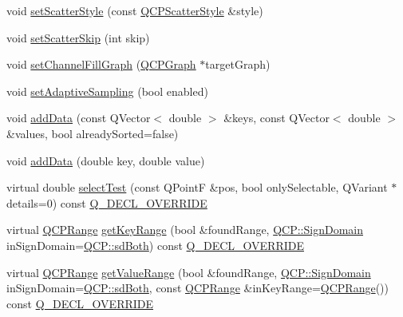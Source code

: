 \begin{DoxyCompactItemize}
\item 
void \hyperlink{class_q_c_p_graph_a12bd17a8ba21983163ec5d8f42a9fea5}{set\+Scatter\+Style} (const \hyperlink{class_q_c_p_scatter_style}{Q\+C\+P\+Scatter\+Style} \&style)
\item 
void \hyperlink{class_q_c_p_graph_a17cebd3196f434258abb82ba6dc443f2}{set\+Scatter\+Skip} (int skip)
\item 
void \hyperlink{class_q_c_p_graph_a2d03156df1b64037a2e36cfa50351ca3}{set\+Channel\+Fill\+Graph} (\hyperlink{class_q_c_p_graph}{Q\+C\+P\+Graph} $\ast$target\+Graph)
\item 
void \hyperlink{class_q_c_p_graph_ab468cd600160f327836aa0644291e64c}{set\+Adaptive\+Sampling} (bool enabled)
\item 
void \hyperlink{class_q_c_p_graph_ae0555c0d3fe0fa7cb8628f88158d420f}{add\+Data} (const Q\+Vector$<$ double $>$ \&keys, const Q\+Vector$<$ double $>$ \&values, bool already\+Sorted=false)
\item 
void \hyperlink{class_q_c_p_graph_a0bf98b1972286cfb7b1c4b7dd6ae2012}{add\+Data} (double key, double value)
\item 
virtual double \hyperlink{class_q_c_p_graph_a6d669d04462d272c6aa0e5f85846d673}{select\+Test} (const Q\+PointF \&pos, bool only\+Selectable, Q\+Variant $\ast$details=0) const \hyperlink{qcustomplot_8hh_a42cc5eaeb25b85f8b52d2a4b94c56f55}{Q\+\_\+\+D\+E\+C\+L\+\_\+\+O\+V\+E\+R\+R\+I\+DE}
\item 
virtual \hyperlink{class_q_c_p_range}{Q\+C\+P\+Range} \hyperlink{class_q_c_p_graph_aac47c6189e3aea46ea46939e5d14796c}{get\+Key\+Range} (bool \&found\+Range, \hyperlink{namespace_q_c_p_afd50e7cf431af385614987d8553ff8a9}{Q\+C\+P\+::\+Sign\+Domain} in\+Sign\+Domain=\hyperlink{namespace_q_c_p_afd50e7cf431af385614987d8553ff8a9aa38352ef02d51ddfa4399d9551566e24}{Q\+C\+P\+::sd\+Both}) const \hyperlink{qcustomplot_8hh_a42cc5eaeb25b85f8b52d2a4b94c56f55}{Q\+\_\+\+D\+E\+C\+L\+\_\+\+O\+V\+E\+R\+R\+I\+DE}
\item 
virtual \hyperlink{class_q_c_p_range}{Q\+C\+P\+Range} \hyperlink{class_q_c_p_graph_a8f773e56f191a61c06e129e90a604d77}{get\+Value\+Range} (bool \&found\+Range, \hyperlink{namespace_q_c_p_afd50e7cf431af385614987d8553ff8a9}{Q\+C\+P\+::\+Sign\+Domain} in\+Sign\+Domain=\hyperlink{namespace_q_c_p_afd50e7cf431af385614987d8553ff8a9aa38352ef02d51ddfa4399d9551566e24}{Q\+C\+P\+::sd\+Both}, const \hyperlink{class_q_c_p_range}{Q\+C\+P\+Range} \&in\+Key\+Range=\hyperlink{class_q_c_p_range}{Q\+C\+P\+Range}()) const \hyperlink{qcustomplot_8hh_a42cc5eaeb25b85f8b52d2a4b94c56f55}{Q\+\_\+\+D\+E\+C\+L\+\_\+\+O\+V\+E\+R\+R\+I\+DE}
\end{DoxyCompactItemize}
